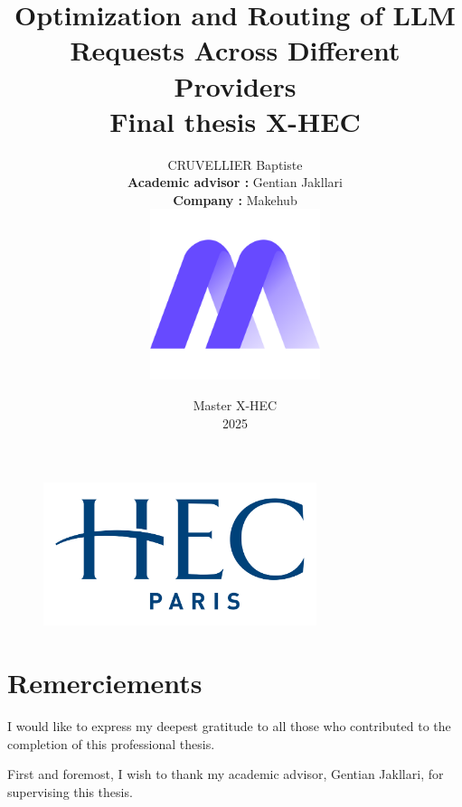 \documentclass[english]{article}
\begin{document}
\begin{figure}[t]
\centering
\includegraphics[width=8cm]{images/hec.png}
\end{figure}

\title{\vspace{2cm} \textbf{Optimization and Routing of LLM Requests Across Different Providers}\\ \vspace{0.5cm} \textbf{Final thesis X-HEC}}
\author{
    CRUVELLIER Baptiste\\[2em]
    \textbf{Academic advisor :} Gentian Jakllari\\
    \textbf{Company :} Makehub\\[1em]
    \includegraphics[width=5cm]{images/logo_makehub.png}
}
\date{\vspace{3cm} Master X-HEC\\
2025 }

\maketitle
\newpage

\section*{Remerciements}

I would like to express my deepest gratitude to all those who contributed to the completion of this professional thesis.

First and foremost, I wish to thank my academic advisor, Gentian Jakllari, for supervising this thesis.
\end{document}
